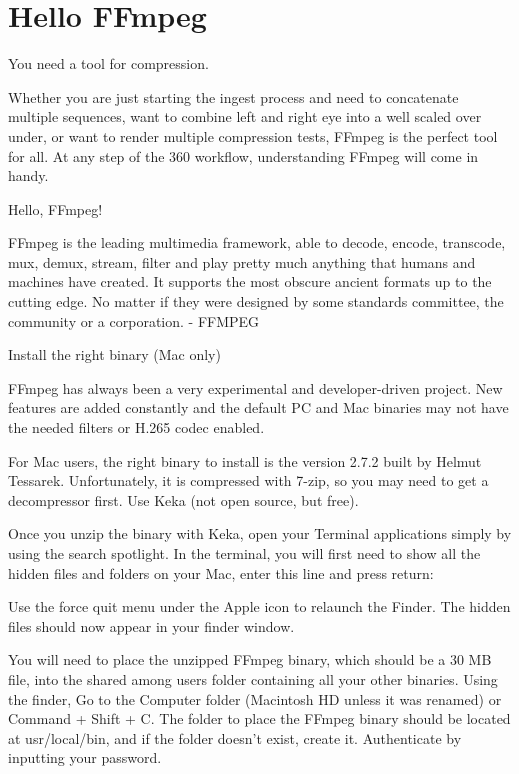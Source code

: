 \chapter{Hello FFmpeg}
\pagecolor{white}
\label{chap:56}
\begin{fullwidth}

\problem

{\large You need a tool for compression. \par}

Whether you are just starting the ingest process and need to concatenate multiple sequences, want to combine left and right eye into a well scaled over under, or want to render multiple compression tests, FFmpeg is the perfect tool for all. At any step of the 360 workflow, understanding FFmpeg will come in handy.

\solutions

{\large Hello, FFmpeg! \par}

FFmpeg is the leading multimedia framework, able to decode, encode, transcode, mux, demux, stream, filter and play pretty much anything that humans and machines have created. It supports the most obscure ancient formats up to the cutting edge. No matter if they were designed by some standards committee, the community or a corporation. - FFMPEG

{\large Install the right binary (Mac only) \par}

FFmpeg has always been a very experimental and developer-driven project. New features are added constantly and the default PC and Mac binaries may not have the needed filters or H.265 codec enabled. 

For Mac users, the right binary to install is the version 2.7.2 built by Helmut Tessarek. Unfortunately, it is compressed with 7-zip, so you may need to get a decompressor first. Use Keka (not open source, but free).

Once you unzip the binary with Keka, open your Terminal applications simply by using the search spotlight. In the terminal, you will first need to show all the hidden files and folders on your Mac, enter this line and press return:


Use the force quit menu under the Apple icon to relaunch the Finder. The hidden files should now appear in your finder window. 

You will need to place the unzipped FFmpeg binary, which should be a 30 MB file, into the shared among users folder containing all your other binaries. Using the finder, Go to the Computer folder (Macintosh HD unless it was renamed) or Command + Shift + C. The folder to place the FFmpeg binary should be located at usr/local/bin, and if the folder doesn’t exist, create it. Authenticate by inputting your password. 


\end{fullwidth}
